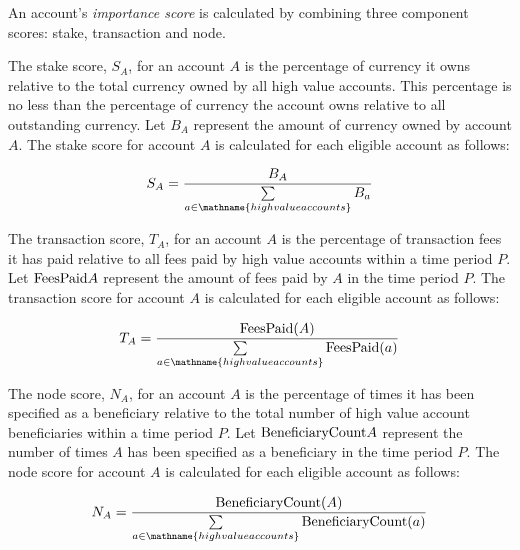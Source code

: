 
An account's \emph{importance score} is calculated by combining three component scores: stake, transaction and node.


The stake score, $S_A$, for an account $A$ is the percentage of currency it owns relative to the total currency owned by all high value accounts.
This percentage is no less than the percentage of currency the account owns relative to all outstanding currency.
Let $B_A$ represent the amount of currency owned by account $A$.
The stake score for account $A$ is calculated for each eligible account as follows:

\begin{equation}
	S_A = \frac{B_A}{\sum\limits_{\substack{a \in \mathname{high value accounts}}} B_a}
\end{equation}

\label{sec:consensus:weighting:transaction}

The transaction score, $T_A$, for an account $A$ is the percentage of transaction fees it has paid relative to all fees paid by high value accounts within a time period $P$.
Let $\mathrm{FeesPaid}{A}$ represent the amount of fees paid by $A$ in the time period $P$.
The transaction score for account $A$ is calculated for each eligible account as follows:

\begin{equation}
	T_A = \frac{\mathfunc{FeesPaid}(A)}{\sum\limits_{\substack{a \in \mathname{high value accounts}}} \mathfunc{FeesPaid}(a)}
\end{equation}


The node score, $N_A$, for an account $A$ is the percentage of times it has been specified as a beneficiary relative to the total number of high value account beneficiaries within a time period $P$.
Let $\mathrm{BeneficiaryCount}{A}$ represent the number of times $A$ has been specified as a beneficiary in the time period $P$.
The node score for account $A$ is calculated for each eligible account as follows:

\begin{equation}
	N_A = \frac{\mathfunc{BeneficiaryCount}(A)}{\sum\limits_{\substack{a \in \mathname{high value accounts}}} \mathfunc{BeneficiaryCount}(a)}
\end{equation}

